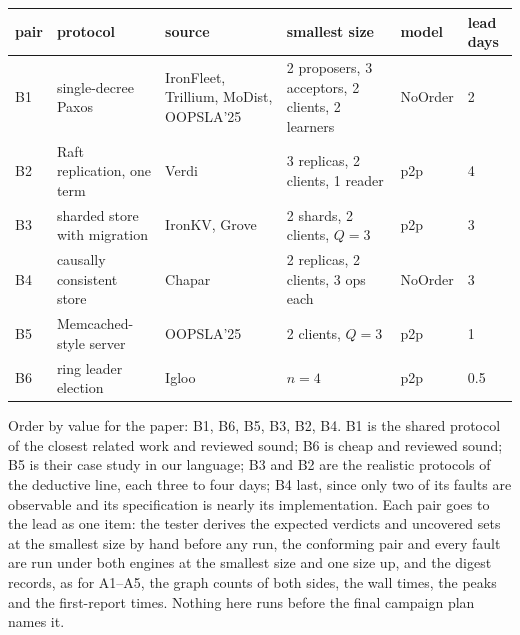 \documentclass[11pt,a4paper]{article}
\begin{document}
\begin{center}
\begin{tabular}{llllll}
\toprule
pair & protocol & source & smallest size & model & lead days \\
\midrule
B1 & single-decree Paxos & IronFleet, Trillium, MoDist, OOPSLA'25 & 2 proposers, 3 acceptors, 2 clients, 2 learners & NoOrder & 2 \\
B2 & Raft replication, one term & Verdi & 3 replicas, 2 clients, 1 reader & p2p & 4 \\
B3 & sharded store with migration & IronKV, Grove & 2 shards, 2 clients, $Q=3$ & p2p & 3 \\
B4 & causally consistent store & Chapar & 2 replicas, 2 clients, 3 ops each & NoOrder & 3 \\
B5 & Memcached-style server & OOPSLA'25 & 2 clients, $Q=3$ & p2p & 1 \\
B6 & ring leader election & Igloo & $n=4$ & p2p & 0.5 \\
\bottomrule
\end{tabular}
\end{center}

Order by value for the paper: B1, B6, B5, B3, B2, B4. B1 is the shared protocol of the closest
related work and reviewed sound; B6 is cheap and reviewed sound; B5 is their case study in our
language; B3 and B2 are the realistic protocols of the deductive line, each three to four days;
B4 last, since only two of its faults are observable and its specification is nearly its
implementation.
Each pair goes to the lead as one item: the tester derives the expected verdicts and uncovered
sets at the smallest size by hand before any run, the conforming pair and every fault are run
under both engines at the smallest size and one size up, and the digest records, as for A1--A5,
the graph counts of both sides, the wall times, the peaks and the first-report times. Nothing
here runs before the final campaign plan names it.
\end{document}
